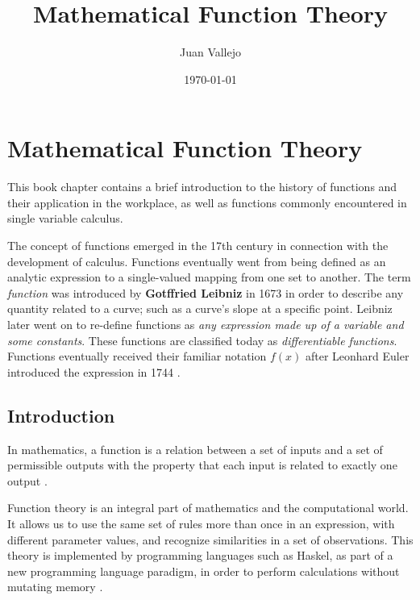 \documentclass[11pt,oneside]{book}              %
\title{\bf Mathematical Function Theory}    %
\author{Juan Vallejo}              %
\date{\today}                           %
\begin{document}
\frontmatter                            %
\maketitle                              %
\tableofcontents                        %
\mainmatter                             %
\chapter{Mathematical Function Theory}                %
This book chapter contains a brief introduction to the history of functions and their application in the workplace, as well as functions commonly encountered in single variable calculus.

The concept of functions emerged in the 17th century in connection with the development of calculus. Functions eventually went from being defined as an analytic expression to a single-valued mapping from one set to another. The term \textit{function} was introduced by \textbf{Gotffried Leibniz} in 1673 in order to describe any quantity related to a curve; such as a curve's slope at a specific point. Leibniz later went on to re-define functions as \textit{any expression made up of a variable and some constants}. These functions are classified today as \textit{differentiable functions}. Functions eventually received their familiar notation $f(x)$ after Leonhard Euler introduced the expression in 1744 \cite{euler1}.

\section{Introduction}                  %
In mathematics, a function is a relation between a set of inputs and a set of permissible outputs with the property that each input is related to exactly one output \cite{wolfram1}.

Function theory is an integral part of mathematics and the computational world. It allows us to use the same set of rules more than once in an expression, with different parameter values, and recognize similarities in a set of observations. This theory is implemented by programming languages such as Haskel, as part of a new programming language paradigm, in order to perform calculations without mutating memory \cite{mathexchange2}.
\end{document}
